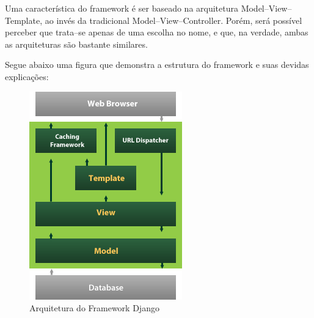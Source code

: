 \documentclass[graduacao,brazil]{ThesisPUC}
\begin{document}
Uma caracter\'{i}stica do framework \'{e} ser baseado na arquitetura Model--View--Template, ao inv\'{e}s
da tradicional Model--View--Controller. Por\'{e}m, ser\'{a} poss\'{i}vel perceber que trata--se apenas de
uma escolha no nome, e que, na verdade, ambas as arquiteturas s\~{a}o bastante similares.

Segue abaixo uma figura que demonstra a estrutura do framework e suas devidas explica\c{c}\~{o}es:

\begin{figure}[H]
    \centering
    \includegraphics[width=\linewidth]{Imagens/django_structure.png}
    \caption{Arquitetura do Framework Django}
\end{figure}
\end{document}
